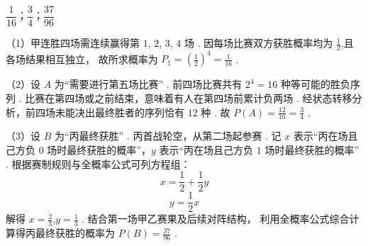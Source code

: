 \documentclass[12pt,UTF-8,a4paper]{ctexart}
\numberwithin{figure}{section}
\theoremstyle{mystyle}
\theoremstyle{mystylekaishu}
\theoremstyle{mystyle}
\numberwithin{xiti}{section}
\begin{document}
\begin{answer}
$\dfrac{1}{16}；\dfrac{3}{4}；\dfrac{37}{96}$
\end{answer}

\begin{solutions}
（1）甲连胜四场需连续赢得第 $1$, $2$, $3$, $4$ 场 .
因每场比赛双方获胜概率均为 $\displaystyle \frac{1}{2}$,且各场结果相互独立，
故所求概率为 $P_1 = \left(\displaystyle \frac{1}{2}\right)^4 = \displaystyle \frac{1}{16}$ .

（2）设 $A$ 为“需要进行第五场比赛” .
前四场比赛共有 $2^4 = 16$ 种等可能的胜负序列 .
比赛在第四场或之前结束，意味着有人在第四场前累计负两场 .
经状态转移分析，前四场未能决出最终胜者的序列恰有 $12$ 种 .
故 $P(A) = \displaystyle \frac{12}{16} = \displaystyle \frac{3}{4}$ .

（3）设 $B$ 为“丙最终获胜” .
丙首战轮空，从第二场起参赛 .
记 $x$ 表示“丙在场且己方负 $0$ 场时最终获胜的概率”，$y$ 表示“丙在场且己方负 $1$ 场时最终获胜的概率” .
根据赛制规则与全概率公式可列方程组：
$$
x = \displaystyle \frac{1}{2} + \displaystyle \frac{1}{2} y
$$
$$
y = \displaystyle \frac{1}{2} x
$$
解得 $x = \displaystyle \frac{2}{3}$,$y = \displaystyle \frac{1}{3}$ .
结合第一场甲乙赛果及后续对阵结构，
利用全概率公式综合计算得丙最终获胜的概率为 $P(B) = \displaystyle \frac{37}{96}$ .
\end{solutions}
\end{document}
